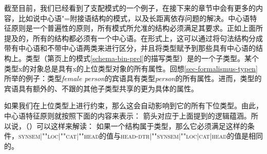 截至目前，我们已经看到了支配模式的一个例子，在接下来的章节中会有更多的内容，比如说中心语"=附接语结构的模式，以及长距离依存问题的解决。中心语特征原则是一个普遍性的原则，所有模式所允准的结构必须满足其要求。正如上面所提及的，所有的结构都必须有一个中心语。在形式上，这可以通过将句法结构分成带有中心语和不带中心语两类来进行区分，并且将类型赋予到那些具有中心语的结构上。类型（第\pageref{schema-bin-prel}页上的模式\ref{schema-bin-prel}的描写类型）是的一个子类型。某个类型x的对象总是具有x的上位类型对象的所有属性。回想\ref{sec-formalismus-typen}所举的例子：类型\textit{female person}的宾语具有类型\textit{person}的所有属性。进而，类型的宾语具有额外的、不跟的其他子类型共享的更为具体的属性。

如果我们在上位类型上进行约束，那么这会自动影响到它的所有下位类型。由此，中心语特征原则就按照下面的内容来表示：
\ea
{} \impl
{} 
\z
箭头\isc{\impl}\is{\impl}对应于上面提到的逻辑蕴涵。所以说，（）可以这样来解读：
如果一个结构属于类型，那么它必须满足这样的条件，\textsc{synsem$|$""loc$|$""cat$|$""head}的值与\textsc{head-dtr$|$""synsem$|$""loc$|$cat$|$head}的值是相同的。

